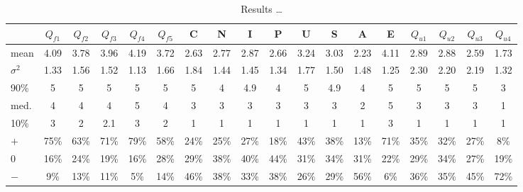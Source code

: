 

\begin{table}
    \caption{Results \dots {}}\label{tab:results:1}
\centering\scriptsize

\begin{tabular}{l|ccccc|cccccccc|cccc}
      & \(Q_{f1}\) & \(Q_{f2}\) & \(Q_{f3}\) & \(Q_{f4}\) & \(Q_{f5}\) & C & N& I& P& U& S & A & E & \(Q_{u1}\) & \(Q_{u2}\) & \(Q_{u3}\) & \(Q_{u4}\) \\
\hline
mean & 4.09 &	3.78 &	3.96 &	4.19 &	3.72 &	2.63 &	2.77 &	2.87 &
2.66 &	3.24 &	3.03 &	2.23 &	4.11 &	2.89 &	2.88 &	2.59 &	1.73 \\
\(\sigma^2\) & 1.33 &	1.56 &	1.52 &	1.13 &	1.66 &	1.84 &	1.44 &
1.45 &	1.34 &	1.77 &	1.50 &	1.48 &	1.25 &	2.30 &	2.20 &	2.19 &
1.32 \\
\hline
90\% &  5 &	5 &	5 &	5 &	5 &	5 &	4 &	4.9 &	4 &	5 &	4.9 &	4 &	5 &	5
&	5 &	5 &	3\\
med.  &  4 &	4 &	4 &	5 &	4 &	3 &	3 &	3 &	3 &	3 &	3 &	2 &	5 &	3 &	3 & 3 & 1\\
10\% & 3 &	2 &	2.1 &	3 &	2 &	1 &	1 &	1 &	1 &	1 &	1 &	1 &	3 &	1 &	1 &	1 &	1\\
\hline
\(+\)  &  75\%&	63\%&	71\%&	79\%&	58\%&	24\%&	25\%&	27\%&	18\%&	43\%&	38\%&	13\%&	71\%&	35\%&	32\%&	27\%&	8\%\\
0      &  16\%&	24\%&	19\%&	16\%&	28\%&	29\%&	38\%&	40\%&	44\%&	31\%&	34\%&	31\%&	22\%&	29\%&	34\%&	27\%&	19\%\\
\(-\)  &   9\%&	13\%&	11\%&	 5\%&	14\%&	46\%&	38\%&	33\%&	38\%&	26\%&	29\%&	56\%&	6\%&	36\%&	35\%&	45\%&	72\%\\

\end{tabular}
\end{table}

